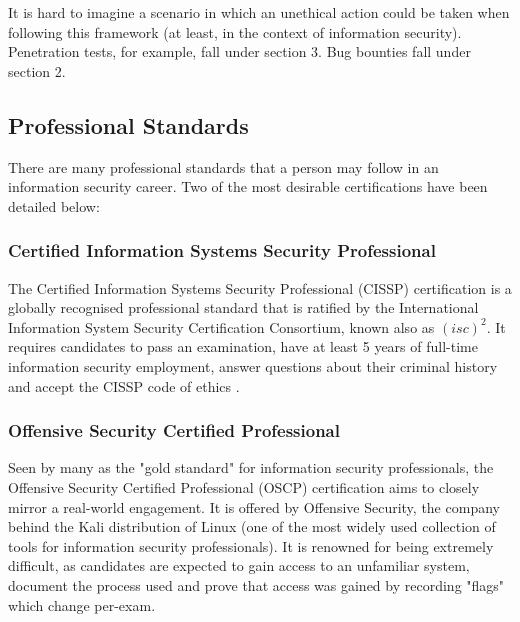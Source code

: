 \documentclass[12pt]{article}
\begin{document}
It is hard to imagine a scenario in which an unethical action could be taken when following this framework (at least, in the context of information security). Penetration tests, for example, fall under section 3. Bug bounties fall under section 2.

\subsection{Professional Standards}
There are many professional standards that a person may follow in an information security career. Two of the most desirable certifications have been detailed below:

\subsubsection{Certified Information Systems Security Professional}
The Certified Information Systems Security Professional (CISSP) certification is a globally recognised professional standard that is ratified by the International Information System Security Certification Consortium, known also as $(isc)^2$. It requires candidates to pass an examination, have at least 5 years of full-time information security employment, answer questions about their criminal history and accept the CISSP code of ethics \citep{CISSPethics}.

\subsubsection{Offensive Security Certified Professional}
Seen by many as the "gold standard" for information security professionals, the Offensive Security Certified Professional (OSCP) certification aims to closely mirror a real-world engagement. It is offered by Offensive Security, the company behind the Kali distribution of Linux (one of the most widely used collection of tools for information security professionals). It is renowned for being extremely difficult, as candidates are expected to gain access to an unfamiliar system, document the process used and prove that access was gained by recording "flags" which change per-exam.

\newpage

\end{document}
